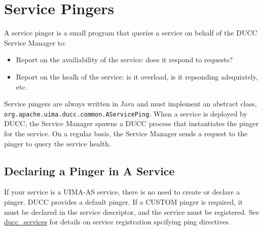       \section{Service Pingers}
      \label{sec:service.pingers}
      A service pinger is a small program that queries a service on behalf of the
      DUCC Service Manager to:
      \begin{itemize}
        \item Report on the availiability of the service: does it respond to requests?
        \item Report on the healh of the service: is it overload, is it repsonding
          adequiately, etc.
      \end{itemize}
      
      Service pingers are always written in Java and must implement an abstract class,
      {\tt org.apache.uima.ducc.common.AServicePing}.   When a service is deployed by
      DUCC, the Service Manager spawns a DUCC process that instantiates the pinger for
      the service.  On a regular basis, the Service Manager sends a request to the pinger
      to query the service health.

      \subsection{Declaring a Pinger in A Service}

      If your service is a UIMA-AS service, there is no need to create or declare a pinger.  DUCC
      provides a default pinger.  If a CUSTOM pinger is required, it must be declared in the service
      descriptor, and the service must be registered.  See
      \hyperref[sec:cli.ducc-services]{ducc\_services} for details on service registration spcifying
      ping directives.

